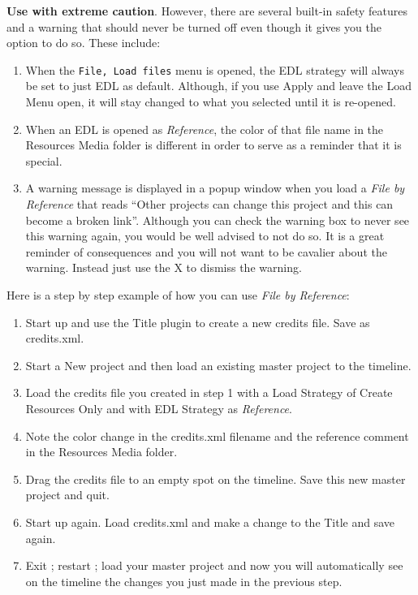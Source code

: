 \textbf{Use with extreme caution}.  However, there are several
built-in safety features and a warning that should never be turned
off even though it gives you the option to do so.  These include:

\begin{enumerate}
\item When the \texttt{File, Load files} menu is opened, the EDL
  strategy will always be set to just EDL as default.  Although, if
  you use Apply and leave the Load Menu open, it will stay changed to
  what you selected until it is re-opened.
\item When an EDL is opened as \textit{Reference}, the color of
  that file name in the Resources Media folder is different in order
  to serve as a reminder that it is special.
\item A warning message is displayed in a popup window when you
  load a \textit{File by Reference} that reads “Other projects can
  change this project and this can become a broken link”.  Although
  you can check the warning box to never see this warning again, you
  would be well advised to not do so.  It is a great reminder of
  consequences and you will not want to be cavalier about the warning.
  Instead just use the X to dismiss the warning.
\end{enumerate}

Here is a step by step example of how you can use \textit{File by
  Reference}:
\begin{enumerate}
\item Start up \CGG{} and use the Title plugin to create a new
  credits file.  Save as credits.xml.
\item Start a New project and then load an existing master
  project to the timeline.
\item Load the credits file you created in step 1 with a Load
  Strategy of Create Resources Only and with EDL Strategy as
  \textit{Reference}.
\item Note the color change in the credits.xml filename and the
  reference comment in the Resources Media folder.
\item Drag the credits file to an empty spot on the timeline.
  Save this new master project and quit.
\item Start \CGG{} up again.  Load credits.xml and make a change
  to the Title and save again.
\item Exit \CGG{}; restart \CGG{}; load your master project and
  now you will automatically see on the timeline the changes you just
  made in the previous step.
\end{enumerate}



